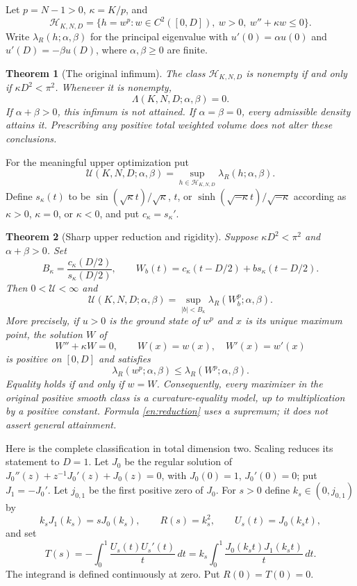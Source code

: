 \documentclass[12pt]{amsart}
\newtheorem{thm}{Theorem}[section]
\theoremstyle{definition}
\theoremstyle{remark}
\numberwithin{equation}{section}
\begin{document}
Let $p=N-1>0$, $\kappa=K/p$, and
\[
 \mathcal H_{K,N,D}=\{h=w^p:w\in C^2([0,D]),\ w>0,\ w''+\kappa w\le0\}.
\]
Write $\lambda_R(h;\alpha,\beta)$ for the principal eigenvalue with
$u'(0)=\alpha u(0)$ and $u'(D)=-\beta u(D)$, where $\alpha,\beta\ge0$ are finite.

\begin{thm}[The original infimum]\label{en:lower}
The class $\mathcal H_{K,N,D}$ is nonempty if and only if
$\kappa D^2<\pi^2$. Whenever it is nonempty,
\[
 \Lambda(K,N,D;\alpha,\beta)=0.
\]
If $\alpha+\beta>0$, this infimum is not attained. If $\alpha=\beta=0$, every admissible density attains it. Prescribing any positive total weighted volume does not alter these conclusions.
\end{thm}

For the meaningful upper optimization put
\[
 \mathcal U(K,N,D;\alpha,\beta)=\sup_{h\in\mathcal H_{K,N,D}}
 \lambda_R(h;\alpha,\beta).
\]
Define $s_\kappa(t)$ to be $\sin(\sqrt\kappa t)/\sqrt\kappa$, $t$, or
$\sinh(\sqrt{-\kappa}t)/\sqrt{-\kappa}$ according as $\kappa>0$, $\kappa=0$, or $\kappa<0$, and put $c_\kappa=s_\kappa'$.

\begin{thm}[Sharp upper reduction and rigidity]\label{en:upper}
Suppose $\kappa D^2<\pi^2$ and $\alpha+\beta>0$. Set
\[
 B_\kappa=\frac{c_\kappa(D/2)}{s_\kappa(D/2)},\qquad
 W_b(t)=c_\kappa(t-D/2)+b s_\kappa(t-D/2).
\]
Then $0<\mathcal U<\infty$ and
\begin{equation}\label{en:reduction}
 \mathcal U(K,N,D;\alpha,\beta)
 =\sup_{|b|<B_\kappa}\lambda_R(W_b^p;\alpha,\beta).
\end{equation}
More precisely, if $u>0$ is the ground state of $w^p$ and $x$ is its unique maximum point, the solution $W$ of
\[
 W''+\kappa W=0,\qquad W(x)=w(x),\quad W'(x)=w'(x)
\]
is positive on $[0,D]$ and satisfies
\[
 \lambda_R(w^p;\alpha,\beta)\le\lambda_R(W^p;\alpha,\beta).
\]
Equality holds if and only if $w=W$. Consequently, every maximizer in the original positive smooth class is a curvature-equality model, up to multiplication by a positive constant. Formula \eqref{en:reduction} uses a supremum; it does not assert general attainment.
\end{thm}

Here is the complete classification in total dimension two. Scaling reduces its statement to $D=1$. Let $J_0$ be the regular solution of
$J_0''(z)+z^{-1}J_0'(z)+J_0(z)=0$, with $J_0(0)=1$, $J_0'(0)=0$; put $J_1=-J_0'$. Let $j_{0,1}$ be the first positive zero of $J_0$. For $s>0$ define $k_s\in(0,j_{0,1})$ by
\begin{equation}\label{en:radialroot}
 k_sJ_1(k_s)=sJ_0(k_s),\qquad
 R(s)=k_s^2,\qquad U_s(t)=J_0(k_st),
\end{equation}
and set
\begin{equation}\label{en:threshold}
 T(s)=-\int_0^1\frac{U_s(t)U_s'(t)}{t}\,dt
 =k_s\int_0^1\frac{J_0(k_st)J_1(k_st)}{t}\,dt.
\end{equation}
The integrand is defined continuously at zero. Put $R(0)=T(0)=0$.
\end{document}
